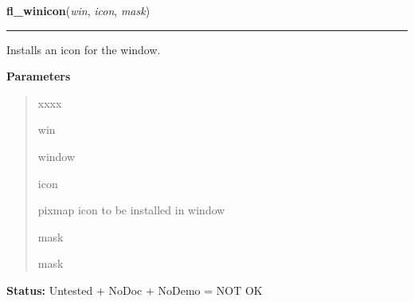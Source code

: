 \hspace{.8\funcindent}\begin{boxedminipage}{\funcwidth}

    \raggedright \textbf{fl\_winicon}(\textit{win}, \textit{icon}, \textit{mask})

    \vspace{-1.5ex}

    \rule{\textwidth}{0.5\fboxrule}
\setlength{\parskip}{2ex}
    Installs an icon for the window.

\setlength{\parskip}{1ex}
      \textbf{Parameters}
      \vspace{-1ex}

      \begin{quote}
        \begin{Ventry}{xxxx}

          \item[win]

          window

          \item[icon]

          pixmap icon to be installed in window

          \item[mask]

          mask

        \end{Ventry}

      \end{quote}

\textbf{Status:} Untested + NoDoc + NoDemo = NOT OK



    \end{boxedminipage}

    \label{xformslib:library:fl_winbackground}

    \vspace{0.5ex}

